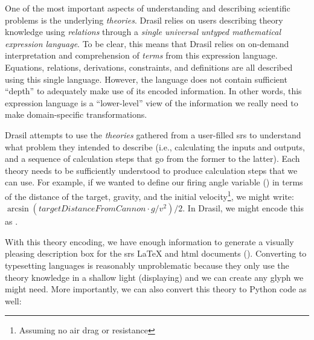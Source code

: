 One of the most important aspects of understanding and describing scientific
problems is the underlying \textit{theories}. Drasil relies on users describing
theory knowledge using \textit{relations} through a \textit{single universal
      untyped mathematical expression language}. To be clear, this means that Drasil
relies on on-demand interpretation and comprehension of \textit{terms} from this
expression language. Equations, relations, derivations, constraints, and
definitions are all described using this single language. However, the language
does not contain sufficient ``depth'' to adequately make use of its encoded
information. In other words, this expression language is a ``lower-level'' view
of the information we really need to make domain-specific transformations.

Drasil attempts to use the \textit{theories} gathered from a user-filled
\acs{srs} to understand what problem they intended to describe (i.e.,
calculating the inputs and outputs, and a sequence of calculation steps that go
from the former to the latter). Each theory needs to be sufficiently understood
to produce calculation steps that we can use. For example, if we wanted to
define our firing angle variable () in terms
of the distance of the target, gravity, and the initial
velocity\footnote{Assuming no air drag or resistance}, we might write:
\(\arcsin{}(\mathit{targetDistanceFromCannon} \cdot{} g / v^2) / 2\). In Drasil,
we might encode this as .

\exampleAngleEquationEncoding{}

With this theory encoding, we have enough information to generate a visually
pleasing description box for the \acs{srs} \LaTeX{} and \acs{html} documents
(). Converting to typesetting languages
is reasonably unproblematic because they only use the theory knowledge in a
shallow light (displaying) and we can create any glyph we might need. More
importantly, we can also convert this theory to Python code as well:

\exampleAngleEquationEncodingToPython{}

